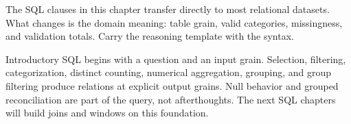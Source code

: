 \transferheading
The SQL clauses in this chapter transfer directly to most relational datasets.
What changes is the domain meaning: table grain, valid categories, missingness,
and validation totals. Carry the reasoning template with the syntax.

\begin{summarybox}
Introductory SQL begins with a question and an input grain. Selection,
filtering, categorization, distinct counting, numerical aggregation, grouping,
and group filtering produce relations at explicit output grains. Null behavior
and grouped reconciliation are part of the query, not afterthoughts. The next
SQL chapters will build joins and windows on this foundation.
\end{summarybox}
